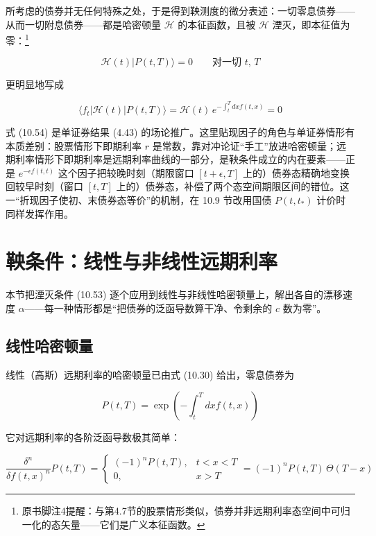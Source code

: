所考虑的债券并无任何特殊之处，于是得到鞅测度的微分表述：一切零息债券——从而一切附息债券——都是哈密顿量 $\mathcal{H}$ 的本征函数，且被 $\mathcal{H}$ 湮灭，即本征值为零：\footnote{原书脚注4提醒：与第4.7节的股票情形类似，债券并非远期利率态空间中可归一化的态矢量——它们是广义本征函数。}

\begin{equation*}
\mathcal{H}(t)|P(t,T)\rangle=0\qquad\text{对一切 } t,\,T
\tag{10.53}
\end{equation*}

更明显地写成

\begin{equation*}
\langle f_t|\mathcal{H}(t)|P(t,T)\rangle=\mathcal{H}(t)\,e^{-\int_t^T dxf(t,x)}=0
\tag{10.54}
\end{equation*}

式 (10.54) 是单证券结果 (4.43) 的场论推广。这里贴现因子的角色与单证券情形有本质差别：股票情形下即期利率 $r$ 是常数，靠对冲论证“手工”放进哈密顿量；远期利率情形下即期利率是远期利率曲线的一部分，是鞅条件成立的内在要素——正是 $e^{-\epsilon f(t,t)}$ 这个因子把较晚时刻（期限窗口 $[t+\epsilon,T]$ 上的）债券态精确地变换回较早时刻（窗口 $[t,T]$ 上的）债券态，补偿了两个态空间期限区间的错位。这一“折现因子使初、末债券态等价”的机制，在 10.9 节改用国债 $P(t,t_*)$ 计价时同样发挥作用。

\section{鞅条件：线性与非线性远期利率}

本节把湮灭条件 (10.53) 逐个应用到线性与非线性哈密顿量上，解出各自的漂移速度 $\alpha$——每一种情形都是“把债券的泛函导数算干净、令剩余的 $c$ 数为零”。

\subsection{线性哈密顿量}

线性（高斯）远期利率的哈密顿量已由式 (10.30) 给出，零息债券为

\begin{equation*}
P(t,T)=\exp\left(-\int_t^T dxf(t,x)\right)
\tag{10.55}
\end{equation*}

它对远期利率的各阶泛函导数极其简单：

\begin{equation*}
\frac{\delta^n}{\delta f(t,x)^n}P(t,T)=
\begin{cases}
(-1)^nP(t,T), & t<x<T\\
0, & x>T
\end{cases}
=(-1)^nP(t,T)\,\Theta(T-x)
\tag{10.56}
\end{equation*}

